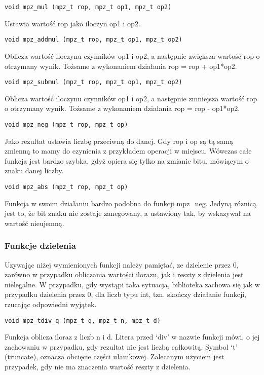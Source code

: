 \documentclass[twoside,a4paper]{book}
\begin{document}
\begin{lstlisting}
void mpz_mul (mpz_t rop, mpz_t op1, mpz_t op2)
\end{lstlisting}
Ustawia wartość rop jako iloczyn op1 i op2.

\begin{lstlisting}
void mpz_addmul (mpz_t rop, mpz_t op1, mpz_t op2)
\end{lstlisting}
Oblicza wartość iloczynu czynników op1 i op2, a następnie zwiększa wartość rop o otrzymany wynik. Tożsame z wykonaniem działania rop = rop + op1*op2.

\begin{lstlisting}
void mpz_submul (mpz_t rop, mpz_t op1, mpz_t op2)
\end{lstlisting}
Oblicza wartość iloczynu czynników op1 i op2, a następnie zmniejsza wartość rop o otrzymany wynik. Tożsame z wykonaniem działania rop = rop - op1*op2.

\begin{lstlisting}
void mpz_neg (mpz_t rop, mpz_t op)
\end{lstlisting}
Jako rezultat ustawia liczbę przeciwną do danej. Gdy rop i op są tą samą zmienną to mamy do czynienia z przykładem operacji w miejscu. Wówczas całe funkcja jest bardzo szybka, gdyż opiera się tylko na zmianie bitu, mówiącym o znaku danej liczby.

\begin{lstlisting}
void mpz_abs (mpz_t rop, mpz_t op)
\end{lstlisting}
Funkcja w swoim działaniu bardzo podobna do funkcji mpz\_neg. Jedyną róznicą jest to, że bit znaku nie zostaje zanegowany, a ustawiony tak, by wskazywał na wartość nieujemną.

\subsubsection{Funkcje dzielenia}
Uzywając niżej wymienionych funkcji należy pamiętać, ze dzielenie przez 0, zarówno w przypadku obliczania wartości ilorazu, jak i reszty z dzielenia jest nielegalne. W przypadku, gdy wystąpi taka sytuacja, biblioteka zachowa się jak w przypadku dzielenia przez 0, dla liczb typu int, tzn. skończy działanie funkcji, rzucając odpowiedni wyjątek.

\begin{lstlisting}
void mpz_tdiv_q (mpz_t q, mpz_t n, mpz_t d)
\end{lstlisting}
Funkcja oblicza iloraz z liczb n i d. Litera przed ‘div’ w nazwie funkcji mówi, o jej zachowaniu w przypadku, gdy rezultat nie jest liczbą całkowitą. Symbol ‘t’ (truncate), oznacza obcięcie części ułamkowej. Zalecanym użyciem jest przypadek, gdy nie ma znaczenia wartość reszty z dzielenia.
\end{document}
